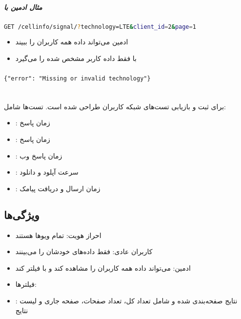 \documentclass{report}
\begin{document}
\paragraph{مثال  ادمین با }
\begin{latin}
\begin{lstlisting}[style=jsonstyle, language=bash]
GET /cellinfo/signal/?technology=LTE&client_id=2&page=1
\end{lstlisting}
\end{latin}
\begin{itemize}
    \item ادمین می‌تواند داده همه کاربران را ببیند
    \item با  فقط داده کاربر مشخص شده را می‌گیرد
\end{itemize}

\paragraph{}
\begin{latin}
\begin{lstlisting}[style=jsonstyle]
{"error": "Missing or invalid technology"}
\end{lstlisting}
\end{latin}

\chapter{}
 برای ثبت و بازیابی تست‌های شبکه کاربران طراحی شده است. تست‌ها شامل:
\begin{itemize}
    \item {}: زمان پاسخ 
    \item {}: زمان پاسخ 
    \item {}: زمان پاسخ وب
    \item {}: سرعت آپلود و دانلود 
    \item {}: زمان ارسال و دریافت پیامک
\end{itemize}

\section{ویژگی‌ها}
\begin{itemize}
    \item احراز هویت: تمام ویوها  هستند
    \item کاربران عادی: فقط داده‌های خودشان را می‌بینند
    \item ادمین: می‌تواند داده همه کاربران را مشاهده کند و با  فیلتر کند
    \item فیلترها: 
    \item {}: نتایج صفحه‌بندی شده و شامل تعداد کل، تعداد صفحات، صفحه جاری و لیست نتایج
\end{itemize}
\end{document}
